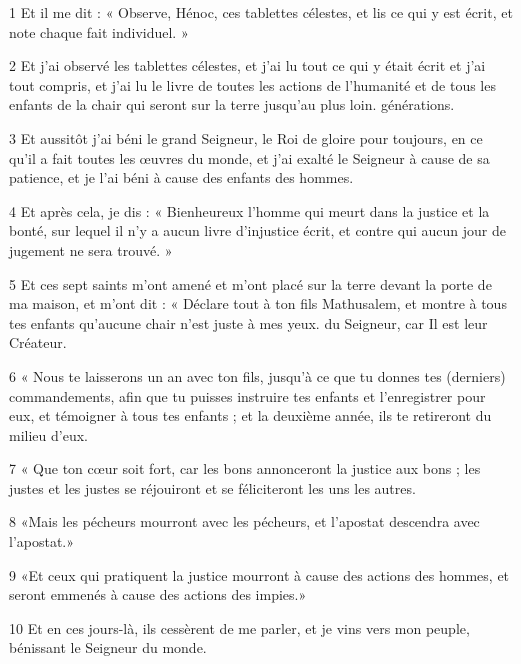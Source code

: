 \par 1 Et il me dit : « Observe, Hénoc, ces tablettes célestes, et lis ce qui y est écrit, et note chaque fait individuel. »
\par 2 Et j'ai observé les tablettes célestes, et j'ai lu tout ce qui y était écrit et j'ai tout compris, et j'ai lu le livre de toutes les actions de l'humanité et de tous les enfants de la chair qui seront sur la terre jusqu'au plus loin. générations.
\par 3 Et aussitôt j'ai béni le grand Seigneur, le Roi de gloire pour toujours, en ce qu'il a fait toutes les œuvres du monde, et j'ai exalté le Seigneur à cause de sa patience, et je l'ai béni à cause des enfants des hommes.
\par 4 Et après cela, je dis : « Bienheureux l'homme qui meurt dans la justice et la bonté, sur lequel il n'y a aucun livre d'injustice écrit, et contre qui aucun jour de jugement ne sera trouvé. »
\par 5 Et ces sept saints m'ont amené et m'ont placé sur la terre devant la porte de ma maison, et m'ont dit : « Déclare tout à ton fils Mathusalem, et montre à tous tes enfants qu'aucune chair n'est juste à mes yeux. du Seigneur, car Il est leur Créateur.
\par 6 « Nous te laisserons un an avec ton fils, jusqu'à ce que tu donnes tes (derniers) commandements, afin que tu puisses instruire tes enfants et l'enregistrer pour eux, et témoigner à tous tes enfants ; et la deuxième année, ils te retireront du milieu d’eux.
\par 7 « Que ton cœur soit fort, car les bons annonceront la justice aux bons ; les justes et les justes se réjouiront et se féliciteront les uns les autres.
\par 8 «Mais les pécheurs mourront avec les pécheurs, et l'apostat descendra avec l'apostat.»
\par 9 «Et ceux qui pratiquent la justice mourront à cause des actions des hommes, et seront emmenés à cause des actions des impies.»
\par 10 Et en ces jours-là, ils cessèrent de me parler, et je vins vers mon peuple, bénissant le Seigneur du monde.


